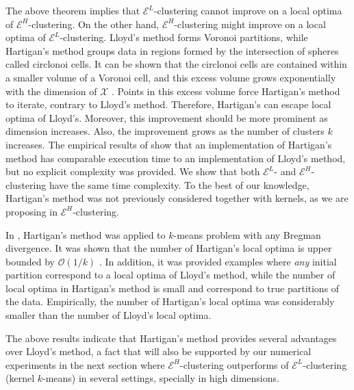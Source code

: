 \documentclass[aps,preprint,nofootinbib,floatfix]{revtex4-1}
\begin{document}
The above theorem implies that $\mathcal{E}^L$-clustering  cannot
improve on a local optima of $\mathcal{E}^H$-clustering. On the other hand,
$\mathcal{E}^H$-clustering might improve on a local optima of 
$\mathcal{E}^L$-clustering. Lloyd's method forms Voronoi partitions,
while Hartigan's method groups data
in regions formed by the intersection of spheres called circlonoi cells.
It can be shown that the circlonoi cells are contained within
a smaller volume of a Voronoi cell, and this excess volume grows
exponentially with the dimension of $\mathcal{X}$ 
\cite[Theorems 2.4 and 3.1]{Telgarsky}. 
Points in this excess volume
force Hartigan's method to iterate, contrary
to Lloyd's method. Therefore, Hartigan's 
can escape local
optima of Lloyd's. 
Moreover, this improvement should be more prominent as
dimension increases. Also, the improvement grows as the number of clusters
$k$ increases.
The empirical results of \citet{Telgarsky} show that 
an implementation of Hartigan's method has comparable execution time 
to an implementation of
Lloyd's method,
but no explicit complexity was provided. We show that both
$\mathcal{E}^L$- and $\mathcal{E}^H$-clustering
have the same time complexity. To the best of our knowledge, Hartigan's
method was not previously considered together with kernels, as we 
are proposing
in $\mathcal{E}^{H}$-clustering.

In \citet{Slonin}, Hartigan's method was applied to $k$-means problem
with any Bregman divergence. It was shown that the number of Hartigan's
local optima is upper bounded by $\mathcal{O}(1/k)$ 
\cite[Proposition 5.1]{Slonin}. 
In addition, it was provided examples where
\emph{any} initial partition correspond to a local optima of Lloyd's 
method, while  the number of local optima in Hartigan's method is small and 
correspond to true partitions of the data. Empirically, the number of
Hartigan's local optima was considerably smaller than the number of Lloyd's
local optima.

The above results indicate that Hartigan's method
provides several advantages over Lloyd's method, a fact that will also
be supported by our numerical experiments in the next section where 
$\mathcal{E}^H$-clustering  outperforms
of $\mathcal{E}^L$-clustering (kernel $k$-means) in several settings,
specially in high dimensions.


\end{document}
